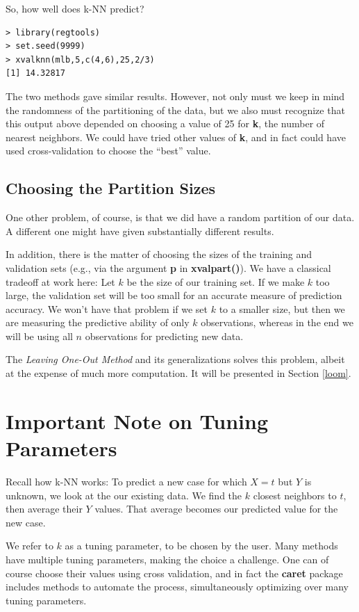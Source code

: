 So, how well does k-NN predict?

\begin{lstlisting}
> library(regtools)
> set.seed(9999)
> xvalknn(mlb,5,c(4,6),25,2/3) 
[1] 14.32817
\end{lstlisting}

The two methods gave similar results.  However, not only must we keep in
mind the randomness of the partitioning of the data, but we also must
recognize that this output above depended on choosing a value of 25 for
{\bf k}, the number of nearest neighbors.  We could have tried other
values of {\bf k}, and in fact could have used cross-validation to
choose the ``best'' value.  

\subsection{Choosing the Partition Sizes}

One other problem, of course, is that we did have a random partition of
our data.  A different one might have given substantially different
results.  

In addition, there is the matter of choosing the sizes of the training and
validation sets (e.g., via the argument {\bf p} in {\bf xvalpart()}).  We
have a classical tradeoff at work here:  Let $k$ be the size of our
training set.  If we make $k$ too large, the validation set will be too
small for an accurate measure of prediction accuracy.  We won't have
that problem if we set $k$ to a smaller size, but then we are measuring
the predictive ability of only $k$ observations, whereas in the end we
will be using all $n$ observations for predicting new data.

The {\it Leaving One-Out Method} and its generalizations solves this
problem, albeit at the expense of much more computation.  It will be
presented in Section \ref{loom}.

\section{Important Note on Tuning Parameters}
\label{tuning}

Recall how k-NN works:  To predict a new case for which $X = t$ but $Y$
is unknown, we look at the our existing data.  We find the $k$ closest
neighbors to $t$, then average their $Y$ values.  That average becomes
our predicted value for the new case.

We refer to $k$ as a tuning parameter, to be chosen by the user.  Many
methods have multiple tuning parameters, making the choice a challenge.
One can of course choose their values using cross validation, and in
fact the {\bf caret} package includes methods to automate the process,
simultaneously optimizing over many tuning parameters.

